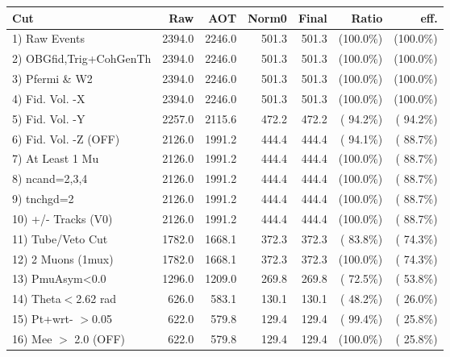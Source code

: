  \begin{table}[h!]\centering
 \begin{tabular}{||l||r|r|r|r|r|r||}
 \hline
 \hline
 Cut & Raw & AOT & Norm0 & Final & Ratio & eff.       \\
 \hline
  1) Raw Events           &       2394.0 &       2246.0 &        501.3 &        501.3 & (100.0\%) & (100.0\%) \\
  2) OBGfid,Trig+CohGenTh &       2394.0 &       2246.0 &        501.3 &        501.3 & (100.0\%) & (100.0\%) \\
  3) Pfermi \& W2         &       2394.0 &       2246.0 &        501.3 &        501.3 & (100.0\%) & (100.0\%) \\
  4) Fid. Vol. -X         &       2394.0 &       2246.0 &        501.3 &        501.3 & (100.0\%) & (100.0\%) \\
  5) Fid. Vol. -Y         &       2257.0 &       2115.6 &        472.2 &        472.2 & ( 94.2\%) & ( 94.2\%) \\
  6) Fid. Vol. -Z (OFF)   &       2126.0 &       1991.2 &        444.4 &        444.4 & ( 94.1\%) & ( 88.7\%) \\
  7) At Least 1 Mu        &       2126.0 &       1991.2 &        444.4 &        444.4 & (100.0\%) & ( 88.7\%) \\
  8) ncand=2,3,4          &       2126.0 &       1991.2 &        444.4 &        444.4 & (100.0\%) & ( 88.7\%) \\
  9) tnchgd=2             &       2126.0 &       1991.2 &        444.4 &        444.4 & (100.0\%) & ( 88.7\%) \\
 10) +/- Tracks (V0)      &       2126.0 &       1991.2 &        444.4 &        444.4 & (100.0\%) & ( 88.7\%) \\
 11) Tube/Veto Cut        &       1782.0 &       1668.1 &        372.3 &        372.3 & ( 83.8\%) & ( 74.3\%) \\
 12) 2 Muons (1mux)       &       1782.0 &       1668.1 &        372.3 &        372.3 & (100.0\%) & ( 74.3\%) \\
 13) PmuAsym<0.0          &       1296.0 &       1209.0 &        269.8 &        269.8 & ( 72.5\%) & ( 53.8\%) \\
 14) Theta$<$2.62 rad     &        626.0 &        583.1 &        130.1 &        130.1 & ( 48.2\%) & ( 26.0\%) \\
 15) Pt+wrt- $>$0.05      &        622.0 &        579.8 &        129.4 &        129.4 & ( 99.4\%) & ( 25.8\%) \\
 16) Mee $>$ 2.0  (OFF)   &        622.0 &        579.8 &        129.4 &        129.4 & (100.0\%) & ( 25.8\%) \\

\end{tabular}
\end{table}
